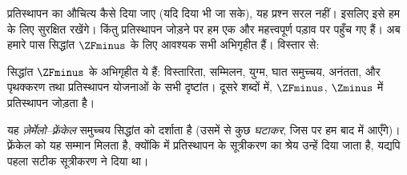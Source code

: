 \documentclass[../../../include/open-logic-section]{subfiles}
\begin{document}

प्रतिस्थापन का औचित्य कैसे दिया जाए (यदि दिया भी जा सके), यह प्रश्न सरल
नहीं। इसलिए इसे हम  के लिए सुरक्षित रखेंगे।
किंतु प्रतिस्थापन जोड़ने पर हम एक और महत्त्वपूर्ण पड़ाव पर पहुँच गए हैं। अब
हमारे पास सिद्धांत $\ZFminus$ के लिए आवश्यक सभी अभिगृहीत हैं। विस्तार से:

\begin{defn}
सिद्धांत $\ZFminus$ के अभिगृहीत ये हैं: विस्तारिता, सम्मिलन, युग्म, घात
समुच्चय, अनंतता, और पृथक्करण तथा प्रतिस्थापन योजनाओं के सभी दृष्टांत। दूसरे
शब्दों में, $\ZFminus$, $\Zminus$ में प्रतिस्थापन जोड़ता है।
\end{defn}
\noindent
यह \emph{ज़ेर्मेलो--फ़्रेंकेल} समुच्चय सिद्धांत को दर्शाता है (उसमें से कुछ
\emph{घटाकर}, जिस पर हम बाद में आएँगे)। फ़्रेंकेल को यह सम्मान मिलता है,
क्योंकि \citeyear{Fraenkel1922} में प्रतिस्थापन के सूत्रीकरण का श्रेय उन्हें
दिया जाता है, यद्यपि पहला सटीक सूत्रीकरण \citet{Skolem1922} ने दिया था।
\end{document}
